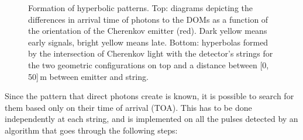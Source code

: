 \documentclass[../Main.tex]{subfiles}
\begin{document}
\begin{figure}[!tbph]
\begin{subfigure}[b]{0.32\textwidth}
  \end{subfigure}
  \hspace*{\fill}
  \caption[Hyperbolic patterns formed by Cherenkov light.]{Formation of hyperbolic patterns. Top: diagrams depicting the differences in arrival time of photons to the DOMs as a function of the orientation of the Cherenkov emitter (red). Dark yellow means early signals, bright yellow means late. Bottom: hyperbolas formed by the intersection of Cherenkov light with the detector's strings for the two geometric configurations on top and a distance between [0, 50]\,m between emitter and string.}
  \label{fig:hyperbolas}
\end{figure}

Since the pattern that direct photons create is known, it is possible to search for them based only on their time of arrival (TOA). This has to be done independently at each string, and is implemented on all the pulses detected by an algorithm that goes through the following steps:
\end{document}
